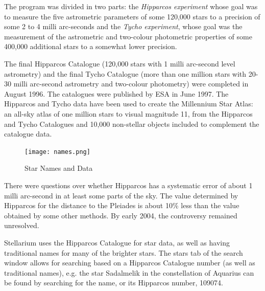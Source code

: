 The program was divided in two parts: the \emph{Hipparcos experiment}
whose goal was to measure the five astrometric parameters of some
120,000 stars to a precision of some 2 to 4 milli arc-seconds and the
\emph{Tycho experiment}, whose goal was the measurement of the
astrometric and two-colour photometric properties of some 400,000
additional stars to a somewhat lower precision.

The final Hipparcos Catalogue (120,000 stars with 1 milli arc-second
level astrometry) and the final Tycho Catalogue (more than one million
stars with 20-30 milli arc-second astrometry and two-colour photometry)
were completed in August 1996. The catalogues were published by ESA in
June 1997. The Hipparcos and Tycho data have been used to create the
Millennium Star Atlas: an all-sky atlas of one million stars to visual
magnitude 11, from the Hipparcos and Tycho Catalogues and 10,000
non-stellar objects included to complement the catalogue data.

\begin{figure}[htb]
\centering\texttt{[image: names.png]}
\caption{Star Names and Data}
\label{fig:starnames}
\end{figure}

There were questions over whether Hipparcos has a systematic error of
about 1 milli arc-second in at least some parts of the sky. The value
determined by Hipparcos for the distance to the Pleiades is about 10\%
less than the value obtained by some other methods. By early 2004, the
controversy remained unresolved.

Stellarium uses the Hipparcos Catalogue for star data, as well as having
traditional names for many of the brighter stars. The stars tab of the
search window allows for searching based on a Hipparcos Catalogue number
(as well as traditional names), e.g. the star Sadalmelik in the
constellation of Aquarius can be found by searching for the name, or
its Hipparcos number, 109074.

%
%


